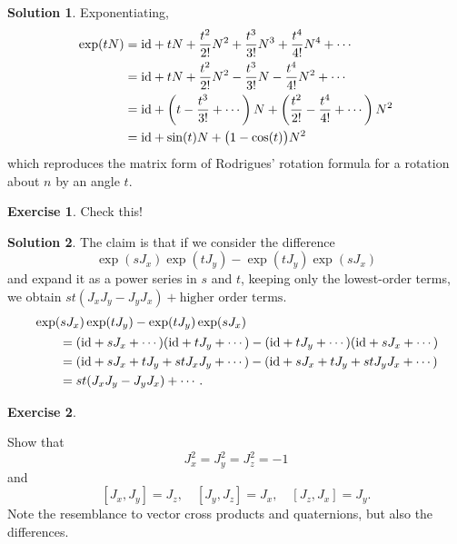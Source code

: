 \documentclass[11pt, a4paper]{report}
\theoremstyle{definition}
\newtheorem{exercise}{Exercise}[part]
\newtheorem{solution}{Solution}[part]
\newenvironment{ex}{\begin{exercise}}{\end{exercise}\pagebreak[1]}
\newenvironment{sol}{\begin{solution}}{\end{solution}\pagebreak[3]}
\newcommand*{\op}[1]{\ensuremath\mathop{}\mathopen{}#1}
\newcommand*{\id}{\op{\mathrm{id}}}
\begin{document}
\begin{sol}
Exponentiating,
\begin{align*}
    \exp (tN)
        &= \id + tN + \frac{t^2}{2!} N^2 + \frac{t^3}{3!} N^3
                     + \frac{t^4}{4!} N^4 + \cdots \\
        &= \id + tN + \frac{t^2}{2!} N^2 - \frac{t^3}{3!} N
                     - \frac{t^4}{4!} N^2 + \cdots \\
        &= \id + \left( t - \frac{t^3}{3!} + \cdots \right) N
              + \left( \frac{t^2}{2!} - \frac{t^4}{4!} + \cdots \right) N^2 \\
        &= \id + \sin(t) N + \bigl(1 - \cos(t) \bigr) N^2
\end{align*}
which reproduces the matrix form of Rodrigues' rotation formula for a rotation about $n$ by an angle $t$.


\end{sol}

\begin{ex}

Check this!

\end{ex}

\begin{sol}

The claim is that if we consider the difference
\[
    \exp(s J_x) \exp(t J_y) - \exp(t J_y) \exp(s J_x)
\]
and expand it as a power series in $s$ and $t$, keeping only the lowest-order terms, we obtain $st(J_x J_y - J_y J_x) + \text{higher order terms}$.
\begin{align*}
    &\exp(s J_x) \exp(t J_y) - \exp(t J_y) \exp(s J_x) \\
    &\qquad\begin{aligned}
        &= (\id + sJ_x + \cdots) (\id + tJ_y + \cdots)
           - (\id + tJ_y + \cdots) (\id + sJ_x + \cdots) \\
        &= (\id + sJ_x + tJ_y + st J_x J_y + \cdots)
           - (\id + sJ_x + tJ_y + st J_y J_x + \cdots) \\
        &= st(J_x J_y - J_y J_x) + \cdots.
    \end{aligned}
\end{align*}

\end{sol}

\begin{ex}\label{ex:so3basis}

Show that
\[
    J_x^2 = J_y^2 = J_z^2 = -1
\]
and
\[
    [J_x, J_y] = J_z, \quad
    [J_y, J_z] = J_x, \quad
    [J_z, J_x] = J_y.
\]
Note the resemblance to vector cross products and quaternions, but also the differences.

\end{ex}
\end{document}
